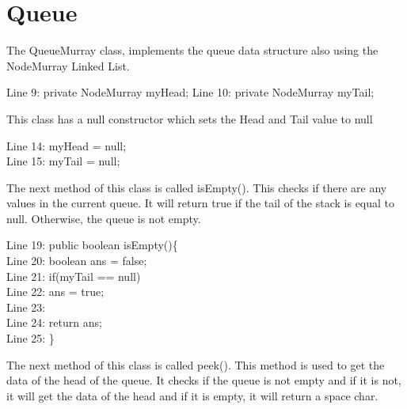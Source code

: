 \documentclass{article}
\begin{document}
\section{Queue}
The QueueMurray class, implements the queue data structure also using the NodeMurray Linked List. 

\vspace{2em}
    \hspace*{1.5em}Line 9: private NodeMurray myHead;
    \hspace*{1.5em}Line 10: private NodeMurray myTail;
\vspace{2em}

\noindent
This class has a null constructor which sets the Head and Tail value to null

\vspace{2em}
Line 14: myHead = null;\\
    \hspace*{1.5em}Line 15: myTail = null;\\
\vspace{2em}

\noindent
The next method of this class is called isEmpty(). This checks if there are any values in the current queue. It will return true if the tail of the stack is equal to null. Otherwise, the queue is not empty.

\vspace{2em}
Line 19: public boolean isEmpty()\{\\
    \hspace*{1.5em}Line 20:\hspace*{1em} boolean ans = false;\\
    \hspace*{1.5em}Line 21: \hspace*{1em}if(myTail == null)\\
	\hspace*{1.5em}Line 22: \hspace*{2em} ans = true;\\
    \hspace*{1.5em}Line 23: \\
	\hspace*{1.5em}Line 24: \hspace*{1em}return ans;\\
    \hspace*{1.5em}Line 25: \}\\
\vspace{2em}

\noindent
The next method of this class is called peek(). This method is used to get the data of the head of the queue. It checks if the queue is not empty and if it is not, it will get the data of the head and if it is empty, it will return a space char.  
\end{document}
